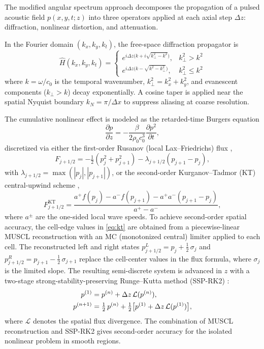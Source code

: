 \documentclass[11pt]{article}
\begin{document}
The modified angular spectrum approach decomposes the propagation of a
pulsed acoustic field $p(x,y,t;z)$ into three operators applied at
each axial step $\Delta z$: diffraction, nonlinear distortion, and
attenuation.

In the Fourier domain $(k_x, k_y, k_t)$, the free-space diffraction
propagator is
\begin{equation}
  \hat{H}(k_x, k_y, k_t) =
  \begin{cases}
    e^{i\Delta z\bigl(k + i\sqrt{k_\perp^2 - k^2}\bigr)}, & k_\perp^2 > k^2 \\[4pt]
    e^{i\Delta z\bigl(k - \sqrt{k^2 - k_\perp^2}\bigr)},   & k_\perp^2 \le k^2
  \end{cases}
  \label{eq:propagator}
\end{equation}
where $k = \omega/c_0$ is the temporal wavenumber, $k_\perp^2 = k_x^2
+ k_y^2$, and evanescent components ($k_\perp > k$) decay
exponentially.  A cosine taper is applied near the spatial Nyquist
boundary $k_N = \pi/\Delta x$ to suppress aliasing at coarse
resolution.

The cumulative nonlinear effect is modeled as the retarded-time
Burgers equation
\begin{equation}
  \frac{\partial p}{\partial z} = -\frac{\beta}{2\rho_0 c_0^3}
  \frac{\partial p^2}{\partial t},
  \label{eq:burgers}
\end{equation}
discretized via either the first-order Rusanov (local Lax--Friedrichs)
flux \cite{rusanov1962},
\begin{equation}
  F_{j+1/2} = -\tfrac{1}{2}(p_j^2 + p_{j+1}^2)
  - \lambda_{j+1/2}(p_{j+1} - p_j),
  \label{eq:rusanov}
\end{equation}
with $\lambda_{j+1/2} = \max(|p_j|, |p_{j+1}|)$, or the second-order
Kurganov--Tadmor (KT) central-upwind scheme \cite{kurganov2000},
\begin{equation}
  F_{j+1/2}^{\mathrm{KT}} =
  \frac{a^+ f(p_j) - a^- f(p_{j+1})
        - a^+ a^-(p_{j+1} - p_j)}{a^+ - a^-},
  \label{eq:kt}
\end{equation}
where $a^{\pm}$ are the one-sided local wave speeds.  To achieve
second-order spatial accuracy, the cell-edge values in \cref{eq:kt}
are obtained from a piecewise-linear MUSCL reconstruction
\cite{vanleer1979} with an MC (monotonized central) limiter applied to
each cell.  The reconstructed left and right states
$p_{j+1/2}^L = p_j + \tfrac{1}{2}\,\sigma_j$ and
$p_{j+1/2}^R = p_{j+1} - \tfrac{1}{2}\,\sigma_{j+1}$ replace the
cell-center values in the flux formula, where $\sigma_j$ is the
limited slope.  The resulting semi-discrete system is advanced in $z$
with a two-stage strong-stability-preserving Runge--Kutta method
(SSP-RK2) \cite{gottlieb2001}:
\begin{align}
  p^{(1)} &= p^{(n)} + \Delta z\,\mathcal{L}(p^{(n)}), \notag \\
  p^{(n+1)} &= \tfrac{1}{2}\,p^{(n)} + \tfrac{1}{2}\bigl[
    p^{(1)} + \Delta z\,\mathcal{L}(p^{(1)})\bigr],
  \label{eq:ssprk2}
\end{align}
where $\mathcal{L}$ denotes the spatial flux divergence.  The
combination of MUSCL reconstruction and SSP-RK2 gives second-order
accuracy for the isolated nonlinear problem in smooth regions.
\end{document}
